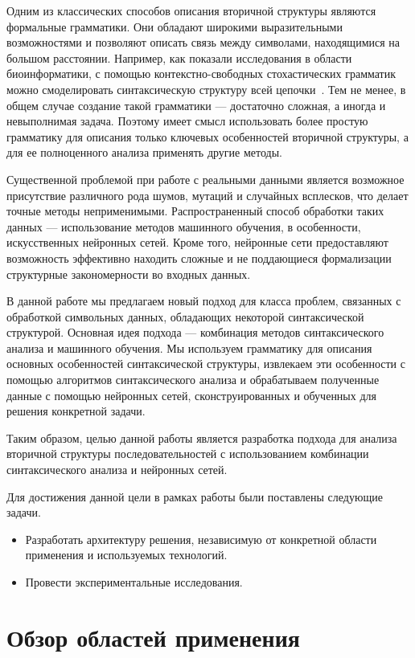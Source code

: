 Одним из классических способов описания вторичной структуры являются формальные грамматики. Они обладают широкими выразительными возможностями и позволяют описать связь между символами, находящимися на большом расстоянии. Например, как показали исследования в области биоинформатики, с помощью контекстно-свободных стохастических грамматик можно смоделировать синтаксическую структуру всей цепочки~\cite{dowell2004rna,PCFG}. Тем не менее, в общем случае создание такой грамматики --- достаточно сложная, а иногда и невыполнимая задача. Поэтому имеет смысл использовать более простую грамматику для описания только ключевых особенностей вторичной структуры, а для ее полноценного анализа применять другие методы.

Существенной проблемой при работе с реальными данными является возможное присутствие различного рода шумов, мутаций и случайных всплесков, что делает точные методы неприменимыми. Распространенный способ обработки таких данных --- использование методов машинного обучения, в особенности, искусственных нейронных сетей. Кроме того, нейронные сети предоставляют возможность эффективно находить сложные и не поддающиеся формализации структурные закономерности во входных данных.

В данной работе мы предлагаем новый подход для класса проблем, связанных с обработкой символьных данных, обладающих некоторой синтаксической структурой. Основная идея подхода --- комбинация методов синтаксического анализа и машинного обучения. Мы используем грамматику для описания основных особенностей синтаксической структуры, извлекаем эти особенности с помощью алгоритмов синтаксического анализа и обрабатываем полученные данные с помощью нейронных сетей, сконструированных и обученных для решения конкретной задачи.

Таким образом, целью данной работы является разработка подхода для анализа вторичной структуры последовательностей с использованием комбинации синтаксического анализа и нейронных сетей.

Для достижения данной цели в рамках работы были поставлены следующие задачи.
\begin{itemize}
    \item Разработать архитектуру решения, независимую от конкретной области применения и используемых технологий.
    \item Провести экспериментальные исследования.
\end{itemize}

\section{Обзор областей применения}
